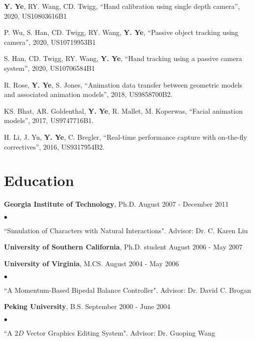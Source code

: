 \documentclass[margin,line]{res}
\newenvironment{list2}{
  \begin{list}{$\bullet$}{%
      \setlength{\itemsep}{0in}
      \setlength{\parsep}{0in} \setlength{\parskip}{0in}
      \setlength{\topsep}{0in} \setlength{\partopsep}{0in} 
      \setlength{\leftmargin}{0.2in}}}{\end{list}}
\begin{document}
\begin{resume}
{\bf Y. Ye},  RY. Wang, CD. Twigg, ``Hand calibration using single depth camera'', 2020, US10803616B1

\vspace*{-.1in}
P. Wu, S. Han, CD. Twigg, RY. Wang, {\bf Y. Ye}, ``Passive object tracking using camera'', 2020, US10719953B1

\vspace*{-.1in}
S. Han, CD. Twigg, RY. Wang, {\bf Y. Ye}, ``Hand tracking using a passive camera system'', 2020, US10706584B1

\vspace*{-.1in}
R. Rose, {\bf Y. Ye}, S. Jones, ``Animation data transfer between geometric models and associated animation models'', 2018, US9858700B2. 

\vspace*{-.1in}
KS. Bhat, AR. Goldenthal, {\bf Y. Ye}, R. Mallet, M. Koperwas, ``Facial animation models'', 2017, US9747716B1.  

\vspace*{-.1in}
H. Li, J. Yu, {\bf Y. Ye}, C. Bregler, ``Real-time performance capture with on-the-fly correctives'', 2016, US9317954B2.


\section{\sc Education}
{\bf Georgia Institute of Technology}, Ph.D.  \hfill August 2007 - December 2011 \\
\begin{list2}
\vspace*{-.15in}
\item ``Simulation of Characters with Natural Interactions". Advisor:  Dr. C. Karen Liu
\end{list2}

\vspace*{-.1in}
{\bf University of Southern California}, Ph.D. student \hfill August 2006 - May 2007

\vspace*{-.1in}
{\bf University of Virginia}, M.CS. \hfill August 2004 - May 2006 \\
\begin{list2}
\vspace*{-.15in}
\item ``A Momentum-Based Bipedal Balance Controller". Advisor: Dr. David C. Brogan
\end{list2}

\vspace*{-.1in}
{\bf Peking University}, B.S. \hfill September 2000 - June 2004 \\
\begin{list2}
\vspace*{-.15in}
\item ``A $2D$ Vector Graphics Editing System". Advisor: Dr. Guoping Wang
\end{list2}


\end{resume}
\end{document}
